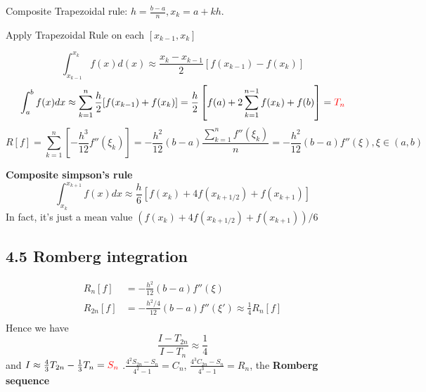 \documentclass[11pt]{article}
\begin{document}
Composite Trapezoidal rule: \(h=\frac{b-a}{n}, x_k=a+kh\).

Apply Trapezoidal Rule on each \([x_{k-1}, x_k]\)

\begin{equation*}
\int_{x_{k-1}}^{x_k}f(x)d(x)\approx \frac{x_k-x_{k-1}}{2}[f(x_{k-1})-f(x_k)]
\end{equation*}
\begin{equation*}
\int_a^bf(x)dx\approx \displaystyle\sum_{k=1}^n\frac{h}{2}[f(x_{k-1})+f(x_k)]=
\frac{h}{2}\left[f(a)+2 \displaystyle\sum_{k=1}^{n-1}f(x_k)+f(b)\right]=
\textcolor{red}{T_n} 
\end{equation*}
\begin{equation*}
R[f]=\displaystyle\sum_{k=1}^n\left[-\frac{h^3}{12}f''(\xi_k)\right]=-\frac{h^2}
{12}(b-a)\frac{\displaystyle\sum_{k=1}^nf''(\xi_k)}{n}=
-\frac{h^2}{12}(b-a)f''(\xi),\xi\in(a,b)
\end{equation*}


\textbf{Composite simpson's rule}
\begin{equation*}
\int_{x_k}^{x_{k+1}}f(x)dx\approx\frac{h}{6}\left[f(x_k)+4f(x_{k+1/2})+f(x_{k+1})\right]
\end{equation*}
In fact, it's just a mean value \((f(x_k)+4f(x_{k+1/2})+f(x_{k+1})) / 6\)

\subsection{4.5 Romberg integration}
\label{sec:org78a9b00}
\begin{align*}
R_n[f]&=-\frac{h^2}{12}(b-a)f''(\xi)\\
R_{2n}[f]&=-\frac{h^2/4}{12}(b-a)f''(\xi')\approx \frac{1}{4}R_n[f]\\
\end{align*}
Hence we have
\begin{equation*}
\frac{I-T_{2n}}{I-T_n}\approx\frac{1}{4}
\end{equation*}
and \(I\approx \frac{4}{3}T_{2n}-\frac{1}{3}T_n=\textcolor{red}{S_n}\)
.\(\frac{4^2S_{2n}-S_n}{4^2-1}=C_n\), \(\frac{4^3C_{2n}-S_n}{4^3-1}=R_n\), the
\textbf{Romberg sequence}
\end{document}
